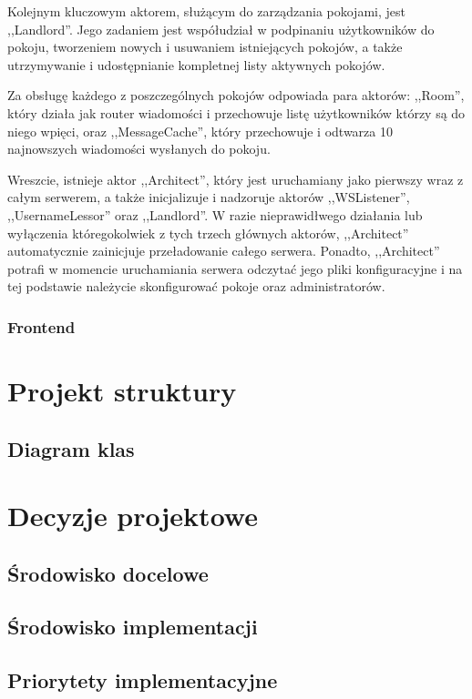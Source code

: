 Kolejnym kluczowym aktorem, służącym do zarządzania pokojami, jest ,,Landlord''.
Jego zadaniem jest współudział w podpinaniu użytkowników do pokoju, tworzeniem
nowych i usuwaniem istniejących pokojów, a także utrzymywanie i udostępnianie
kompletnej listy aktywnych pokojów.

Za  obsługę każdego z poszczególnych pokojów odpowiada para aktorów: ,,Room'',
który działa jak router wiadomości i przechowuje listę użytkowników którzy
są do niego wpięci, oraz ,,MessageCache'', który przechowuje i odtwarza 10
najnowszych wiadomości wysłanych do pokoju.

Wreszcie, istnieje aktor ,,Architect'', który jest uruchamiany jako pierwszy
wraz z całym
serwerem, a także inicjalizuje i nadzoruje aktorów ,,WSListener'',
,,UsernameLessor'' oraz ,,Landlord''. W razie nieprawidłwego działania lub
wyłączenia któregokolwiek z tych trzech głównych aktorów, ,,Architect''
automatycznie zainicjuje przeładowanie całego serwera. Ponadto, ,,Architect''
potrafi w momencie uruchamiania serwera odczytać jego pliki konfiguracyjne i
na tej podstawie należycie skonfigurować pokoje oraz administratorów.

\subsubsection{Frontend}


\section{Projekt struktury}

\subsection{Diagram klas}

\section{Decyzje projektowe}

\subsection{Środowisko docelowe}

\subsection{Środowisko implementacji}

\subsection{Priorytety implementacyjne}

